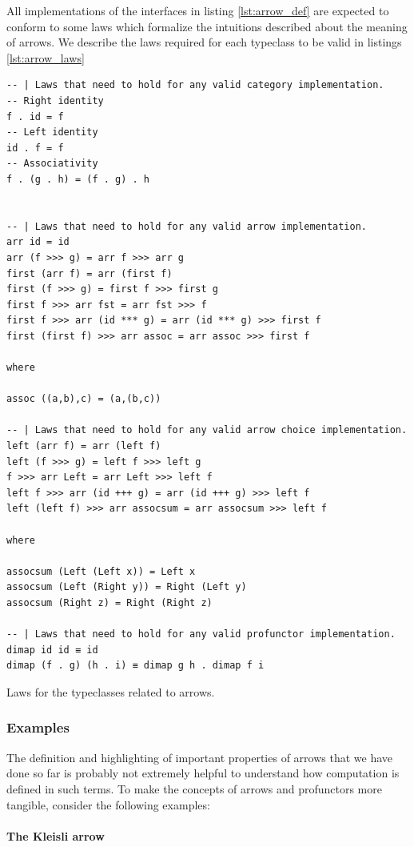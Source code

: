 All implementations of the interfaces in listing \ref{lst:arrow_def}
are expected to conform to some laws which formalize the intuitions
described about the meaning of arrows. We describe the laws required
for each typeclass to be valid in listings \ref{lst:arrow_laws}

\begin{code}
\begin{verbatim}
-- | Laws that need to hold for any valid category implementation.
-- Right identity
f . id = f
-- Left identity
id . f = f
-- Associativity
f . (g . h) = (f . g) . h


-- | Laws that need to hold for any valid arrow implementation.
arr id = id
arr (f >>> g) = arr f >>> arr g
first (arr f) = arr (first f)
first (f >>> g) = first f >>> first g
first f >>> arr fst = arr fst >>> f
first f >>> arr (id *** g) = arr (id *** g) >>> first f
first (first f) >>> arr assoc = arr assoc >>> first f

where

assoc ((a,b),c) = (a,(b,c))

-- | Laws that need to hold for any valid arrow choice implementation.
left (arr f) = arr (left f)
left (f >>> g) = left f >>> left g
f >>> arr Left = arr Left >>> left f
left f >>> arr (id +++ g) = arr (id +++ g) >>> left f
left (left f) >>> arr assocsum = arr assocsum >>> left f

where

assocsum (Left (Left x)) = Left x
assocsum (Left (Right y)) = Right (Left y)
assocsum (Right z) = Right (Right z)

-- | Laws that need to hold for any valid profunctor implementation.
dimap id id ≡ id
dimap (f . g) (h . i) ≡ dimap g h . dimap f i
\end{verbatim}
  \caption{\label{lst:arrow_laws}Laws for the typeclasses related to
    arrows.}
\end{code}

\subsubsection{Examples}

The definition and highlighting of important properties of arrows that
we have done so far is probably not extremely helpful to understand
how computation is defined in such terms. To make the concepts of
arrows and profunctors more tangible, consider the following examples:

\paragraph{The Kleisli arrow}

